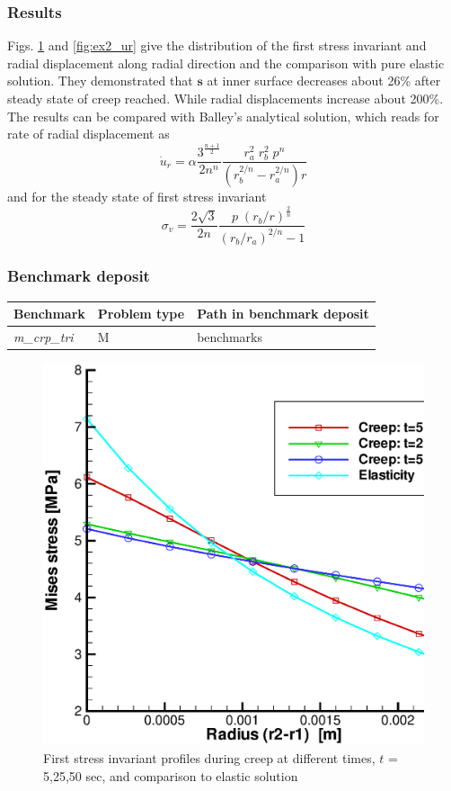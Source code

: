 \subsubsection*{Results}

Figs. \ref{fig:ex2_q} and \ref{fig:ex2_ur} give the distribution of
the first stress invariant and radial displacement along radial
direction and the comparison with pure elastic solution. They
demonstrated that $\mathbf s$ at inner surface decreases about 26\%
after steady state of creep reached. While radial displacements
increase about 200\%.
%
The results can be compared with Balley's analytical solution, which
reads for rate of radial displacement as
%
\[
  \dot u_{r} =\alpha \dfrac{3^{\frac{n+1}{2}}}{2n^n}\dfrac{r_{a}^2\;r_{b}^2\;p^n}{(r_{b}^{2/n}-r_{a}^{2/n})r}
\]
and for the steady state of first stress invariant
\[
  \sigma_v =\dfrac{2\sqrt 3}{2n} \dfrac{p\;\left(r_b/r\right)^{\frac{2}{n}}}{(r_{b}/r_a)^{2/n}-1}
\]

\subsubsection*{Benchmark deposit}
\begin{tabular}{|l|l|l|}
  \hline
  Benchmark & Problem type & Path in benchmark deposit \\
  \hline
 \emph{m\_crp\_tri}& M & benchmarks\verb \M\ \\
  \hline
\end{tabular}

\begin{figure}[H]
\centering
\includegraphics[scale=0.4]{M/crp/ex2_q}
\vspace{-3mm}
\caption{First stress invariant profiles during creep at different times, $t$ = 5,25,50 sec,
and comparison to elastic solution}
\label{fig:ex2_q}
\end{figure}

